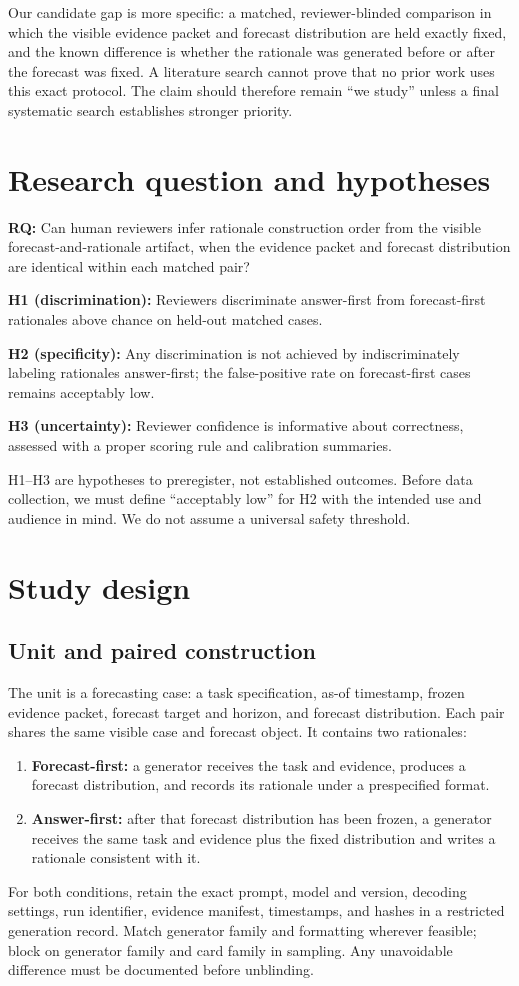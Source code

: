 \documentclass[10pt]{article}
\begin{document}
Our candidate gap is more specific: a matched, reviewer-blinded comparison in which the visible evidence packet and forecast distribution are held exactly fixed, and the known difference is whether the rationale was generated before or after the forecast was fixed. A literature search cannot prove that no prior work uses this exact protocol. The claim should therefore remain “we study” unless a final systematic search establishes stronger priority.

\section{Research question and hypotheses}
\textbf{RQ:} Can human reviewers infer rationale construction order from the visible forecast-and-rationale artifact, when the evidence packet and forecast distribution are identical within each matched pair?

\textbf{H1 (discrimination):} Reviewers discriminate answer-first from forecast-first rationales above chance on held-out matched cases.

\textbf{H2 (specificity):} Any discrimination is not achieved by indiscriminately labeling rationales answer-first; the false-positive rate on forecast-first cases remains acceptably low.

\textbf{H3 (uncertainty):} Reviewer confidence is informative about correctness, assessed with a proper scoring rule and calibration summaries.

H1--H3 are hypotheses to preregister, not established outcomes. Before data collection, we must define “acceptably low” for H2 with the intended use and audience in mind. We do not assume a universal safety threshold.

\section{Study design}
\subsection{Unit and paired construction}
The unit is a forecasting case: a task specification, as-of timestamp, frozen evidence packet, forecast target and horizon, and forecast distribution. Each pair shares the same visible case and forecast object. It contains two rationales:
\begin{enumerate}[leftmargin=*]
\item \textbf{Forecast-first:} a generator receives the task and evidence, produces a forecast distribution, and records its rationale under a prespecified format.
\item \textbf{Answer-first:} after that forecast distribution has been frozen, a generator receives the same task and evidence plus the fixed distribution and writes a rationale consistent with it.
\end{enumerate}
For both conditions, retain the exact prompt, model and version, decoding settings, run identifier, evidence manifest, timestamps, and hashes in a restricted generation record. Match generator family and formatting wherever feasible; block on generator family and card family in sampling. Any unavoidable difference must be documented before unblinding.
\end{document}
